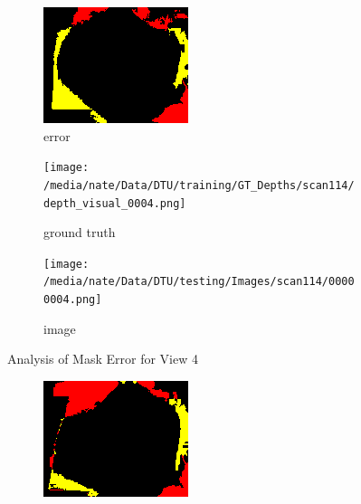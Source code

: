 \documentclass{article}
\begin{document}
\begin{figure}
\begin{subfigure}{0.3\textwidth}
		\includegraphics[width=\textwidth]{./output/004_error.png}
		\caption{error}
		\label{fig:error4}
	\end{subfigure}
	\hfill
	\centering
	\begin{subfigure}{0.3\textwidth}
		\centering
		\texttt{[image: /media/nate/Data/DTU/training/GT\_Depths/scan114/depth\_visual\_0004.png]}
		\caption{ground truth}
		\label{fig:gt4}
	\end{subfigure}
	\hfill
	\centering
	\begin{subfigure}{0.3\textwidth}
		\centering
		\texttt{[image: /media/nate/Data/DTU/testing/Images/scan114/00000004.png]}
		\caption{image}
		\label{fig:img4}
	\end{subfigure}
	\hfill
	\caption{Analysis of Mask Error for View 4}
	\label{fig:error_analys4}
\end{figure}\begin{figure}
	\centering
	\begin{subfigure}{0.3\textwidth}
		\centering
		\includegraphics[width=\textwidth]{./output/005_error.png}

\end{subfigure}
\end{figure}
\end{document}
